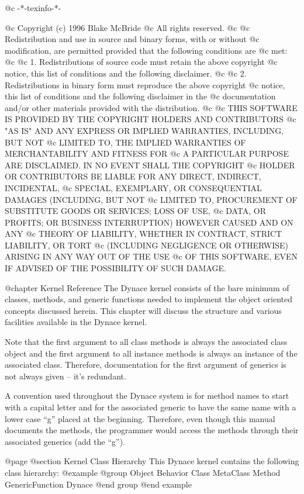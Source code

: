 @c -*-texinfo-*-

@c  Copyright (c) 1996 Blake McBride
@c  All rights reserved.
@c
@c  Redistribution and use in source and binary forms, with or without
@c  modification, are permitted provided that the following conditions are
@c  met:
@c
@c  1. Redistributions of source code must retain the above copyright
@c  notice, this list of conditions and the following disclaimer.
@c
@c  2. Redistributions in binary form must reproduce the above copyright
@c  notice, this list of conditions and the following disclaimer in the
@c  documentation and/or other materials provided with the distribution.
@c
@c  THIS SOFTWARE IS PROVIDED BY THE COPYRIGHT HOLDERS AND CONTRIBUTORS
@c  "AS IS" AND ANY EXPRESS OR IMPLIED WARRANTIES, INCLUDING, BUT NOT
@c  LIMITED TO, THE IMPLIED WARRANTIES OF MERCHANTABILITY AND FITNESS FOR
@c  A PARTICULAR PURPOSE ARE DISCLAIMED. IN NO EVENT SHALL THE COPYRIGHT
@c  HOLDER OR CONTRIBUTORS BE LIABLE FOR ANY DIRECT, INDIRECT, INCIDENTAL,
@c  SPECIAL, EXEMPLARY, OR CONSEQUENTIAL DAMAGES (INCLUDING, BUT NOT
@c  LIMITED TO, PROCUREMENT OF SUBSTITUTE GOODS OR SERVICES; LOSS OF USE,
@c  DATA, OR PROFITS; OR BUSINESS INTERRUPTION) HOWEVER CAUSED AND ON ANY
@c  THEORY OF LIABILITY, WHETHER IN CONTRACT, STRICT LIABILITY, OR TORT
@c  (INCLUDING NEGLIGENCE OR OTHERWISE) ARISING IN ANY WAY OUT OF THE USE
@c  OF THIS SOFTWARE, EVEN IF ADVISED OF THE POSSIBILITY OF SUCH DAMAGE.

@chapter Kernel Reference
The Dynace kernel consists of the bare minimum of classes, methods, and generic
functions needed to implement the object oriented concepts discussed herein.
This chapter will discuss the structure and various facilities available in
the Dynace kernel.

Note that the first argument to all class methods is always the
associated class object and the first argument to all instance methods
is always an instance of the associated class.  Therefore, documentation
for the first argument of generics is not always given -- it's redundant.

A convention used throughout the Dynace system is for method names to start
with a capital letter and for the associated generic to have the same
name with a lower case ``g'' placed at the beginning.  Therefore, even
though this manual documents the methods, the programmer would access
the methods through their associated generics (add the ``g'').

@page
@section Kernel Class Hierarchy
This Dynace kernel contains the following class hierarchy:
@example
@group
     Object
          Behavior
               Class
               MetaClass
          Method
          GenericFunction
          Dynace
@end group
@end example

